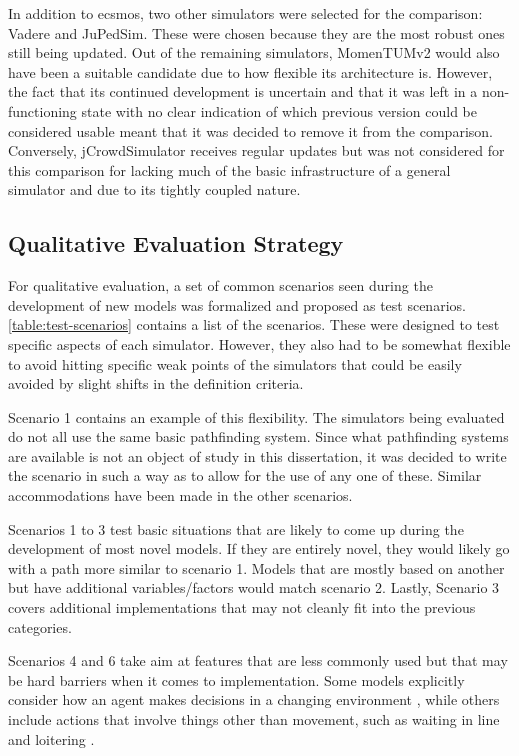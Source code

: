 \documentclass[twoside, 11pt]{article}
\begin{document}
In addition to \gls{ecsmos}, two other simulators were selected for the comparison: Vadere and JuPedSim. These were chosen because they are the most robust ones still being updated. Out of the remaining simulators, MomenTUMv2 would also have been a suitable candidate due to how flexible its architecture is. However, the fact that its continued development is uncertain and that it was left in a non-functioning state with no clear indication of which previous version could be considered usable meant that it was decided to remove it from the comparison. Conversely, jCrowdSimulator receives regular updates but was not considered for this comparison for lacking much of the basic infrastructure of a general simulator and due to its tightly coupled nature.

\subsection{Qualitative Evaluation Strategy} \label{sec:qualitative-evaluation}

For qualitative evaluation, a set of common scenarios seen during the development of new models was formalized and proposed as test scenarios. \autoref{table:test-scenarios} contains a list of the scenarios. These were designed to test specific aspects of each simulator. However, they also had to be somewhat flexible to avoid hitting specific weak points of the simulators that could be easily avoided by slight shifts in the definition criteria. 

Scenario 1 contains an example of this flexibility. The simulators being evaluated do not all use the same basic pathfinding system. Since what pathfinding systems are available is not an object of study in this dissertation, it was decided to write the scenario in such a way as to allow for the use of any one of these. Similar accommodations have been made in the other scenarios. 

Scenarios 1 to 3 test basic situations that are likely to come up during the development of most novel models. If they are entirely novel, they would likely go with a path more similar to scenario 1. Models that are mostly based on another but have additional variables/factors would match scenario 2. Lastly, Scenario 3 covers additional implementations that may not cleanly fit into the previous categories.

Scenarios 4 and 6 take aim at features that are less commonly used but that may be hard barriers when it comes to implementation. Some models explicitly consider how an agent makes decisions in a changing environment \cite{DEIULIIS2023104527}, while others include actions that involve things other than movement, such as waiting in line and loitering \cite{KIM2013232, ALAM2022100527}. 
\end{document}
